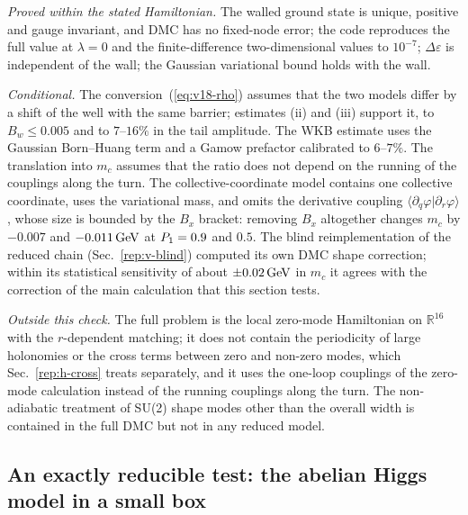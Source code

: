 \emph{Proved within the stated Hamiltonian.} The walled ground state is unique, positive and gauge invariant, and DMC has no fixed-node error; the code reproduces the full value at $\lambda=0$ and the finite-difference two-dimensional values to $10^{-7}$; $\Delta\varepsilon$ is independent of the wall; the Gaussian variational bound holds with the wall.

\emph{Conditional.} The conversion~(\ref{eq:v18-rho}) assumes that the two models differ by a shift of the well with the same barrier; estimates (ii) and (iii) support it, to $B_w\le0.005$ and to $7$--$16\%$ in the tail amplitude.
The WKB estimate uses the Gaussian Born--Huang term and a Gamow prefactor calibrated to $6$--$7\%$.
The translation into $m_c$ assumes that the ratio does not depend on the running of the couplings along the turn.
The collective-coordinate model contains one collective coordinate, uses the variational mass, and omits the derivative coupling $\langle\partial_q\varphi|\partial_r\varphi\rangle$, whose size is bounded by the $B_x$ bracket: removing $B_x$ altogether changes $m_c$ by $-0.007$ and $-0.011\,\mathrm{GeV}$ at $P_1=0.9$ and $0.5$. %
The blind reimplementation of the reduced chain (Sec.~\ref{rep:v-blind}) computed its own DMC shape correction; within its statistical sensitivity of about $\pm0.02\,\mathrm{GeV}$ in $m_c$ it agrees with the correction of the main calculation that this section tests. %

\emph{Outside this check.} The full problem is the local zero-mode Hamiltonian on $\mathbb R^{16}$ with the $r$-dependent matching; it does not contain the periodicity of large holonomies or the cross terms between zero and non-zero modes, which Sec.~\ref{rep:h-cross} treats separately, and it uses the one-loop couplings of the zero-mode calculation instead of the running couplings along the turn.
The non-adiabatic treatment of SU(2) shape modes other than the overall width is contained in the full DMC but not in any reduced model.


\subsection{An exactly reducible test: the abelian Higgs model in a small box}\label{sec:v11-abelian}

